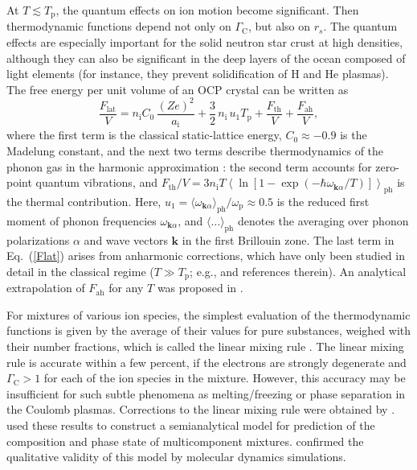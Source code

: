 \documentclass[smallextended]{svjour3}       %
\newcommand{\beq}{\begin{equation}}
\newcommand{\eeq}{\end{equation}}
\newcounter{count}
\newcommand{\aion}{a_\mathrm{i}}
\newcommand{\Gami}{\Gamma_{\mathrm{C}}}
\newcommand{\nion}{n_\mathrm{i}}
\newcommand{\omp}{\omega_\mathrm{p}}
\newcommand{\req}[1]{Eq.~(\ref{#1})}
\newcommand{\Tp}{T_\mathrm{p}}
\begin{document}
At $T\lesssim\Tp$, the quantum effects on ion motion become
significant. Then thermodynamic functions depend not only on
$\Gami$, but also on $r_s$. The quantum effects are
especially important for the solid neutron star crust at high
densities, although they can also be significant in the deep layers
of the ocean composed of light elements (for instance, they
prevent solidification of H and He plasmas). The free
energy per unit volume of an OCP crystal can be written as
\beq
   \frac{F_\mathrm{lat}}{V} = \nion C_0
\,\frac{(Ze)^2}{\aion }
    + \frac32\, \nion \, u_1 \Tp + 
     \frac{F_\mathrm{th}}{V} + \frac{F_\mathrm{ah}}{V},
\label{Flat}
\eeq
where the first term is the classical static-lattice energy,
$C_0\approx-0.9$ is the Madelung constant, and the next two
terms describe thermodynamics of the phonon gas in the
harmonic approximation \citep[e.g.,][]{Kittel63}: the second
term accounts for zero-point quantum vibrations, and
$F_\mathrm{th}/V = 3 \nion T \left\langle\ln
[1-\exp(-\hbar\omega_{\bm{k}\alpha} / T)]
\right\rangle_\mathrm{ph}$ is the thermal contribution.
Here, 
$u_1=\langle\omega_{\bm{k}\alpha}\rangle_\mathrm{ph}/\omp\approx0.5$
is the reduced first moment of phonon frequencies 
$\omega_{\bm{k}\alpha}$, and
$\langle\ldots\rangle_\mathrm{ph}$ denotes the averaging
over phonon polarizations $\alpha$ and wave vectors $\bm{k}$
in the first Brillouin zone. The last term in \req{Flat}
arises from anharmonic corrections, which have only been studied
in detail in the classical regime ($T\gg\Tp$; e.g.,
\citealp{FaroukiHamaguchi} and references therein).
An analytical extrapolation of $F_\mathrm{ah}$ for any
$T$ was proposed in \citet{PC10}.

For mixtures of various ion species, the simplest
evaluation of the thermodynamic functions is given by the
average of their values for pure substances, weighed with
their number fractions, which is called the  linear mixing
rule \citep{HTV77}. The linear mixing rule is accurate
within a few percent, if the electrons are strongly
degenerate and $\Gami>1$ for each of the ion species in the
mixture. However, this accuracy may be insufficient for such
subtle phenomena as melting/freezing or phase separation in
the Coulomb plasmas. Corrections to the linear mixing rule
were obtained by \citet{Pmix09}. \citet{MedinCumming10} used
these results to construct a semianalytical model for
prediction of the composition and phase state of
multicomponent mixtures. \citet{Hughto-ea12} confirmed the
qualitative validity of this model by molecular dynamics simulations.
\end{document}
